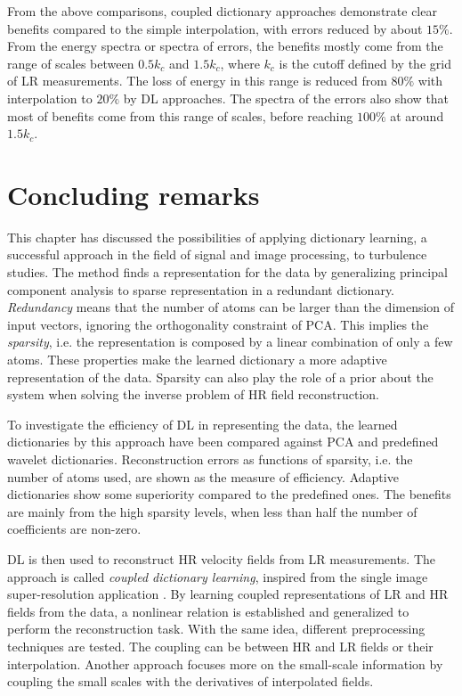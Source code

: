 From the above comparisons, coupled dictionary approaches demonstrate clear benefits compared to the simple interpolation, with errors reduced by about $ 15\% $. From the energy spectra or spectra of errors, the benefits mostly come from the range of scales between $ 0.5k_c $ and $ 1.5k_c $, where $ k_c $ is the cutoff defined by the grid of LR measurements. The loss of energy in this range is reduced from $ 80\% $ with interpolation to $ 20\% $ by DL approaches. The spectra of the errors also show that most of benefits come from this range of scales, before reaching $ 100\% $ at around $ 1.5k_c $.

\section{Concluding remarks}
This chapter has discussed the possibilities of applying dictionary learning, a successful approach in the field of signal and image processing, to turbulence studies. The method finds a representation for the data by generalizing principal component analysis to sparse representation in a redundant dictionary. \textit{Redundancy} means that the number of atoms can be larger than the dimension of input vectors, ignoring the orthogonality constraint of PCA. This implies the \textit{sparsity}, i.e. the representation is composed by a linear combination of only a few atoms. These properties make the learned dictionary a more adaptive representation of the data. Sparsity can also play the role of a prior about the system when solving the inverse problem of HR field reconstruction. 

To investigate the efficiency of DL in representing the data, the learned dictionaries by this approach have been compared against PCA and predefined wavelet dictionaries. Reconstruction errors as functions of sparsity, i.e. the number of atoms used, are shown as the measure of efficiency. Adaptive dictionaries show some superiority compared to the predefined ones. The benefits are mainly from the high sparsity levels, when less than half the number of coefficients are non-zero. 

DL is then used to reconstruct HR velocity fields from LR measurements. The approach is called \textit{coupled dictionary learning}, inspired from the single image super-resolution application \citet{yang2010image,zeyde2012single}. By learning coupled representations of LR and HR fields from the data, a nonlinear relation is established and generalized to perform the reconstruction task. With the same idea, different preprocessing techniques are tested. The coupling can be between HR and LR fields or their interpolation. Another approach focuses more on the small-scale information by coupling the small scales with the derivatives of interpolated fields. 

